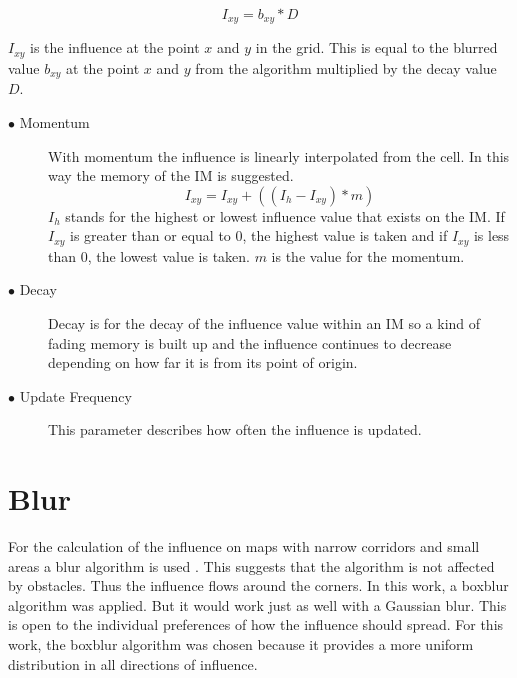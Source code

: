 \documentclass[]{report}
\begin{document}
	\begin{equation}
		I_{xy} = b_{xy} * D
	\end{equation}
	
	$I_{xy}$ is the influence at the point $x$ and $y$ in the grid. This is equal to the blurred value $b_{xy}$ at the point $x$ and $y$ from the algorithm multiplied by the decay value $D$.
	
	
	\begin{description}
		\item[$\bullet$ Momentum] With momentum the influence is linearly interpolated from the cell. In this way the memory of the IM is suggested.
		\begin{equation}
			I_{xy} = I_{xy} + ((I_{h} - I_{xy}) * m) 
		\end{equation}
		$I_{h}$ stands for the highest or lowest influence value that exists on the IM. If $I_{xy}$ is greater than or equal to $0$, the highest value is taken and if $I_{xy}$ is less than $0$, the lowest value is taken. $m$ is the value for the momentum. 
		
		\item[$\bullet$ Decay] Decay is for the decay of the influence value within an \ac{IM} so a kind of fading memory is built up and the influence continues to decrease depending on how far it is from its point of origin.
		\item[$\bullet$ Update Frequency] This parameter describes how often the influence is updated. 
		\end {description}
		
		\section{Blur } \label{ssec:num1}
		For the calculation of the influence on maps with narrow corridors and small areas a blur algorithm is used \citep{gameDevInfluenceMap}. This suggests that the algorithm is not affected by obstacles. Thus the influence flows around the corners. In this work, a boxblur algorithm was applied. But it would work just as well with a Gaussian blur. This is open to the individual preferences of how the influence should spread. For this work, the boxblur algorithm was chosen because it provides a more uniform distribution in all directions of influence. 
		
\end{document}
